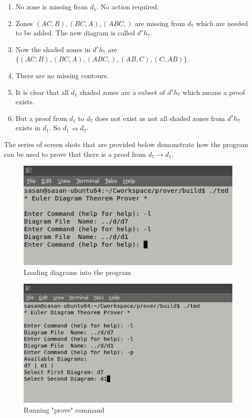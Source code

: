 \documentclass[10pt, a4paper, titlepage]{article}
\begin{document}
\begin{enumerate}
\item No zone is missing from $ d_{1} $. No action required.
\item Zones $ (AC,B), (BC,A), (ABC, ) $ are missing from $ d_{7} $ which are needed to be added. The new diagram is called $ d^sh_{7} $.
\item Now the shaded zones in $ d^sh_{7} $ are $ \lbrace (AC,B), (BC,A), (ABC, ), (AB,C), (C,AB) \rbrace $.
\item There are no missing contours.
\item It is clear that all $ d_{1} $ shaded zones are a subset of $ d^sh_{7} $ which means a proof exists.
\item But a proof from $ d_{1} $ to $ d_{7} $ does not exist as not all shaded zones from $ d^sh_{7} $ exists in $ d_{1} $. So $ d_{1} \nrightarrow d_{7} $.
\end{enumerate}

The series of screen shots that are provided below demonstrate how the program can be used to prove that there is a proof from $ d_{7} \rightarrow d_{1} $.

\begin{figure}[h]
\centering
\includegraphics[scale=0.7]{images/ss1.png}
\caption{Loading diagrams into the program}
\label{fig:loading}
\end{figure}

\begin{figure}[h]
\centering
\includegraphics[scale=0.7]{images/ss2.png}
\caption{Running "prove" command}
\label{fig:prove}
\end{figure}
\end{document}
